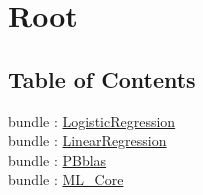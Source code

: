 \chapter*{Root}
\hypertarget{ecldoc:toc:root}{}


\section*{Table of Contents}
bundle : \hyperlink{ecldoc:toc:LogisticRegression}{LogisticRegression}   \\
bundle : \hyperlink{ecldoc:toc:LinearRegression}{LinearRegression}   \\
bundle : \hyperlink{ecldoc:toc:PBblas}{PBblas}   \\
bundle : \hyperlink{ecldoc:toc:ML_Core}{ML\_Core}   \\





